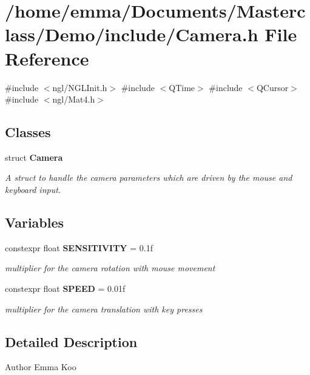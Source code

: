 \section{/home/emma/\+Documents/\+Masterclass/\+Demo/include/\+Camera.h File Reference}
\label{_camera_8h}
{\ttfamily \#include $<$ngl/\+N\+G\+L\+Init.\+h$>$}\newline
{\ttfamily \#include $<$Q\+Time$>$}\newline
{\ttfamily \#include $<$Q\+Cursor$>$}\newline
{\ttfamily \#include $<$ngl/\+Mat4.\+h$>$}\newline
\subsection*{Classes}
\begin{DoxyCompactItemize}
\item 
struct \textbf{ Camera}
\begin{DoxyCompactList}\small\item\em A struct to handle the camera parameters which are driven by the mouse and keyboard input. \end{DoxyCompactList}\end{DoxyCompactItemize}
\subsection*{Variables}
\begin{DoxyCompactItemize}
\item 
constexpr float \textbf{ S\+E\+N\+S\+I\+T\+I\+V\+I\+TY} = 0.\+1f
\begin{DoxyCompactList}\small\item\em multiplier for the camera rotation with mouse movement \end{DoxyCompactList}\item 
constexpr float \textbf{ S\+P\+E\+ED} = 0.\+01f
\begin{DoxyCompactList}\small\item\em multiplier for the camera translation with key presses \end{DoxyCompactList}\end{DoxyCompactItemize}


\subsection{Detailed Description}
\begin{DoxyAuthor}{Author}
Emma Koo 
\end{DoxyAuthor}


